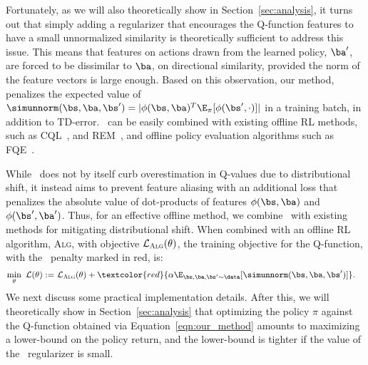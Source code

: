 Fortunately, as we will also theoretically show in Section~\ref{sec:analysis},
it turns out that simply adding a regularizer that encourages the Q-function features to have a small unnormalized similarity
is theoretically sufficient to address this issue. This means that features on actions drawn from the learned policy, $\ba'$, are forced to be dissimilar to $\ba$, on directional similarity, provided the norm of the feature vectors is large enough.
Based on this observation, our method, \methodname\,
penalizes the expected value of $\simunnorm(\bs, \ba, \bs') = |\phi(\bs, \ba)^T \E_{\pi}[\phi(\bs', \cdot)]|$ in a training batch, in addition to TD-error. 
\methodname\ can be easily combined with existing offline RL methods, such as CQL~\citep{kumar2020conservative}, and REM~\citep{agarwal2019optimistic}, and offline policy evaluation algorithms such as FQE~\citep{le2019batch}.

While \methodname\ does not by itself curb overestimation in Q-values due to distributional shift, it instead aims to prevent feature aliasing with an additional loss that penalizes the absolute value of dot-products of features $\phi(\bs, \ba)$ and $\phi(\bs', \ba')$. Thus, for an effective offline method, we combine \methodname\ with existing methods for mitigating distributional shift. %
When combined with an offline RL algorithm, \textsc{Alg}, with objective $\mathcal{L}_{\textsc{Alg}}(\theta)$, the training objective for the Q-function, with the \methodname\ penalty marked in red, is: 
\begin{align}
    \min_\theta~ \mathcal{L}(\theta) := &\  \mathcal{L}_{\textsc{Alg}}(\theta) + \textcolor{red}{\alpha \E_{\bs, \ba, \bs' \sim \data}[\simunnorm(\bs, \ba, \bs')]}.
\label{eqn:our_method}
\end{align}
We next discuss some practical implementation details. After this, we will theoretically show in Section~\ref{sec:analysis} that optimizing the policy $\pi$ against the Q-function obtained via Equation~\ref{eqn:our_method} amounts to maximizing a lower-bound on the policy return, and the lower-bound is tighter if the value of the \methodname\ regularizer is small.

